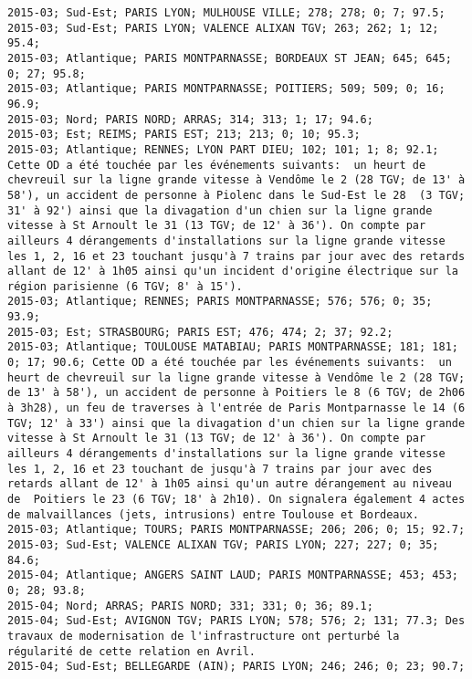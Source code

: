 \documentclass{article}
\begin{document}
\begin{Verbatim}[commandchars=\\\{\}]
2015-03; Sud-Est; PARIS LYON; MULHOUSE VILLE; 278; 278; 0; 7; 97.5; 
2015-03; Sud-Est; PARIS LYON; VALENCE ALIXAN TGV; 263; 262; 1; 12; 95.4; 
2015-03; Atlantique; PARIS MONTPARNASSE; BORDEAUX ST JEAN; 645; 645; 0; 27; 95.8; 
2015-03; Atlantique; PARIS MONTPARNASSE; POITIERS; 509; 509; 0; 16; 96.9; 
2015-03; Nord; PARIS NORD; ARRAS; 314; 313; 1; 17; 94.6; 
2015-03; Est; REIMS; PARIS EST; 213; 213; 0; 10; 95.3; 
2015-03; Atlantique; RENNES; LYON PART DIEU; 102; 101; 1; 8; 92.1; Cette OD a été touchée par les événements suivants:  un heurt de chevreuil sur la ligne grande vitesse à Vendôme le 2 (28 TGV; de 13' à 58'), un accident de personne à Piolenc dans le Sud-Est le 28  (3 TGV; 31' à 92') ainsi que la divagation d'un chien sur la ligne grande vitesse à St Arnoult le 31 (13 TGV; de 12' à 36'). On compte par ailleurs 4 dérangements d'installations sur la ligne grande vitesse les 1, 2, 16 et 23 touchant jusqu'à 7 trains par jour avec des retards allant de 12' à 1h05 ainsi qu'un incident d'origine électrique sur la région parisienne (6 TGV; 8' à 15').
2015-03; Atlantique; RENNES; PARIS MONTPARNASSE; 576; 576; 0; 35; 93.9; 
2015-03; Est; STRASBOURG; PARIS EST; 476; 474; 2; 37; 92.2; 
2015-03; Atlantique; TOULOUSE MATABIAU; PARIS MONTPARNASSE; 181; 181; 0; 17; 90.6; Cette OD a été touchée par les événements suivants:  un heurt de chevreuil sur la ligne grande vitesse à Vendôme le 2 (28 TGV; de 13' à 58'), un accident de personne à Poitiers le 8 (6 TGV; de 2h06 à 3h28), un feu de traverses à l'entrée de Paris Montparnasse le 14 (6 TGV; 12' à 33') ainsi que la divagation d'un chien sur la ligne grande vitesse à St Arnoult le 31 (13 TGV; de 12' à 36'). On compte par ailleurs 4 dérangements d'installations sur la ligne grande vitesse les 1, 2, 16 et 23 touchant de jusqu'à 7 trains par jour avec des retards allant de 12' à 1h05 ainsi qu'un autre dérangement au niveau de  Poitiers le 23 (6 TGV; 18' à 2h10). On signalera également 4 actes de malvaillances (jets, intrusions) entre Toulouse et Bordeaux.
2015-03; Atlantique; TOURS; PARIS MONTPARNASSE; 206; 206; 0; 15; 92.7; 
2015-03; Sud-Est; VALENCE ALIXAN TGV; PARIS LYON; 227; 227; 0; 35; 84.6; 
2015-04; Atlantique; ANGERS SAINT LAUD; PARIS MONTPARNASSE; 453; 453; 0; 28; 93.8; 
2015-04; Nord; ARRAS; PARIS NORD; 331; 331; 0; 36; 89.1; 
2015-04; Sud-Est; AVIGNON TGV; PARIS LYON; 578; 576; 2; 131; 77.3; Des travaux de modernisation de l'infrastructure ont perturbé la régularité de cette relation en Avril.
2015-04; Sud-Est; BELLEGARDE (AIN); PARIS LYON; 246; 246; 0; 23; 90.7; 

\end{Verbatim}
\end{document}
